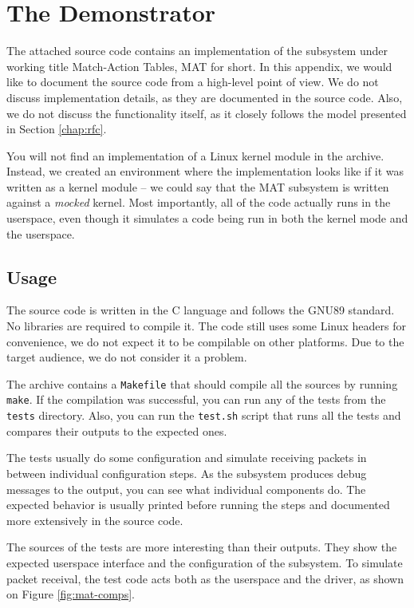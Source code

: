\chapter{The Demonstrator}
\label{app:doc}


The attached source code contains an implementation of the subsystem under
working title Match-Action Tables, MAT for short. In this appendix, we would
like to document the source code from a high-level point of view. We do not
discuss implementation details, as they are documented in the source code.
Also, we do not discuss the functionality itself, as it closely follows the
model presented in Section \ref{chap:rfc}.

You will not find an implementation of a Linux kernel module in the archive.
Instead, we created an environment where the implementation looks like if it
was written as a kernel module -- we could say that the MAT subsystem is
written against a \emph{mocked} kernel. Most importantly, all of the code
actually runs in the userspace, even though it simulates a code being run in
both the kernel mode and the userspace.

\section{Usage}

The source code is written in the C language and follows the GNU89 standard.
No libraries are required to compile it. The code still uses some Linux
headers for convenience, we do not expect it to be compilable on other
platforms. Due to the target audience, we do not consider it a problem.

The archive contains a \texttt{Makefile} that should compile all the sources by
running \texttt{make}. If the compilation was successful, you can run any of
the tests from the \texttt{tests} directory. Also, you can run the
\texttt{test.sh} script that runs all the tests and compares their outputs to
the expected ones.

The tests usually do some configuration and simulate receiving packets in
between individual configuration steps. As the subsystem produces debug messages to the
output, you can see what individual components do. The expected behavior is
usually printed before running the steps and documented more extensively in
the source code.

The sources of the tests are more interesting than their outputs. They show
the expected userspace interface and the configuration of the subsystem. To
simulate packet receival, the test code acts both as the userspace and the
 driver, as shown on Figure \ref{fig:mat-comps}.

